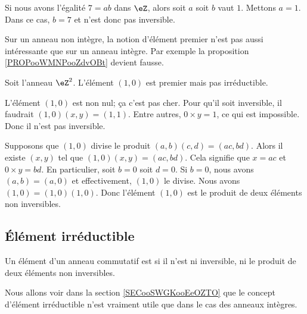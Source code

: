\begin{example}
	Si nous avons l'égalité \( 7=ab\) dans \( \eZ\), alors soit \( a\) soit \( b\) vaut \( 1\). Mettons \( a=1\). Dans ce cas, \( b=7\) et n'est donc pas inversible.
\end{example}

Sur un anneau non intègre, la notion d'élément premier n'est pas aussi intéressante que sur un anneau intègre. Par exemple la proposition \ref{PROPooWMNPooZdvOBt} devient fausse.

\begin{example}     \label{EXooEIUEooCZCPMC}
	Soit l'anneau \( \eZ^2\). L'élément \( (1,0)\) est premier mais pas irréductible.
	\begin{subproof}
		L'élément \( (1,0)\) est non nul; ça c'est pas cher. Pour qu'il soit inversible, il faudrait \( (1,0)(x,y)=(1,1)\). Entre autres, \( 0\times y=1\), ce qui est impossible. Donc il n'est pas inversible.

		Supposons que \( (1,0)\) divise le produit \( (a,b)(c,d)=(ac,bd)\). Alors il existe \( (x,y)\) tel que \( (1,0)(x,y)=(ac,bd)\). Cela signifie que \( x=ac\) et \( 0\times y=bd\). En particulier, soit \( b=0\) soit \( d=0\). Si \( b=0\), nous avons \( (a,b)=(a,0)\) et effectivement, \( (1,0)\) le divise.
		Nous avons \( (1,0)=(1,0)(1,0)\). Donc l'élément \( (1,0)\) est le produit de deux éléments non inversibles.
	\end{subproof}
\end{example}



\subsection{Élément irréductible}

\begin{definition}  \label{DeirredBDhQfA}
	Un élément d'un anneau commutatif est  si il n'est ni inversible, ni le produit de deux éléments non inversibles. 
\end{definition}

\begin{normaltext}
	Nous allons voir dans la section \ref{SECooSWGKooEeOZTO} que le concept d'élément irréductible n'est vraiment utile que dans le cas des anneaux intègres.
\end{normaltext}

